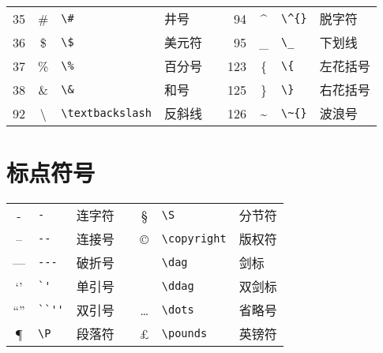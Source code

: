 \begin{table}[h]
\centering
\begin{tabular}{r c p{15ex} l p{5ex} r c p{15ex} l}
	\hline

	 35 & \#             & \verb|\#|             & 井号 &&
	 94 & \^{}           & \verb|\^{}|           & 脱字符 \\

	 36 & \$             & \verb|\$|             & 美元符 &&
	 95 & \_             & \verb|\_|             & 下划线 \\

	 37 & \%             & \verb|\%|             & 百分号 &&
	123 & \{             & \verb|\{|             & 左花括号 \\

	 38 & \&             & \verb|\&|             & 和号 &&
	125 & \}             & \verb|\}|             & 右花括号 \\

	 92 & \textbackslash & \verb|\textbackslash| & 反斜线 &&
	126 & \~{}           & \verb|\~{}|           & 波浪号 \\

	\hline
\end{tabular}
\end{table}

\section{标点符号}

\begin{table}[h]
\centering
\begin{tabular}{c p{15ex} l p{5ex} c p{15ex} l}
	\hline

	-          & \verb|-|          & 连字符 &&
	\S         & \verb|\S|         & 分节符 \\

	--         & \verb|--|         & 连接号 &&
	\copyright & \verb|\copyright| & 版权符 \\

	---        & \verb|---|        & 破折号 &&
	\dag       & \verb|\dag|       & 剑标 \\

	`'         & \verb|`'|         & 单引号 &&
	\ddag      & \verb|\ddag|      & 双剑标 \\

	``''       & \verb|``''|       & 双引号 &&
	\dots      & \verb|\dots|      & 省略号 \\

	\P         & \verb|\P|         & 段落符 &&
	\pounds    & \verb|\pounds|    & 英镑符 \\

	\hline
\end{tabular}
\end{table}

